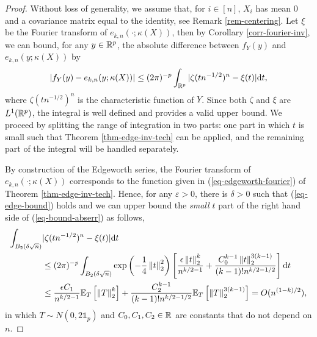 \begin{proof}
    Without loss of generality, we assume that, for $i \in [n]$, $X_i$ has mean 0 and a covariance matrix equal to the identity, see Remark \ref{rem-centering}. Let $\xi$ be the Fourier transform of $e_{k, n}(\cdot; \kappa(X))$, then by Corollary \ref{corr-fourier-inv}, we can bound, for any $y \in \Rp$, the absolute difference between $f_Y(y)$ and $e_{k, n}(y; \kappa(X))$ by
    \begin{equation} \label{eq-bound-abserr}
        |f_Y(y) - e_{k, n}(y; \kappa(X))| \leq (2\pi)^{-p}\intRp{t}{|\zeta(tn^{-1/2})^n - \xi(t)|},
    \end{equation}
    where $\zeta(tn^{-1/2})^n$ is the characteristic function of $Y$. Since both $\zeta$ and $\xi$ are $L^1(\Rp)$, the integral is well defined and provides a valid upper bound. We proceed by splitting the range of integration in two parts: one part in which $t$ is small such that Theorem \ref{thm-edge-inv-tech} can be applied, and the remaining part of the integral will be handled separately.

    By construction of the Edgeworth series, the Fourier transform of $e_{k, n}(\cdot; \kappa(X))$ corresponds to the function given in (\ref{eq-edgeworth-fourier}) of Theorem \ref{thm-edge-inv-tech}. Hence, for any $\varepsilon > 0$, there is $\delta > 0$ such that (\ref{eq-edge-bound}) holds and we can upper bound the \textit{small $t$} part of the right hand side of (\ref{eq-bound-abserr}) as follows,
    \begin{align*}
        \int_{B_2(\delta\sqrt{n})} &|\zeta(tn^{-1/2})^n - \xi(t)| \d t\\
        &\leq (2\pi)^{-p}\int_{B_2(\delta\sqrt{n})}\expf{-\frac{1}{4}\norm{t}_2^2}\left[ \frac{\epsilon\norm{t}_2^k}{n^{k/2-1}} + \frac{C_0^{k-1}\norm{t}_2^{3(k-1)}}{(k-1)!n^{k/2-1/2}} \right] \d t \\
        &\leq \frac{\epsilon C_1}{n^{k/2-1}}\expec{T}{\norm{T}^k_2} + \frac{C_2^{k-1}}{(k-1)!n^{k/2-1/2}}\expec{T}{\norm{T}_2^{3(k-1)}}
        = O(n^{(1-k)/2}),
    \end{align*}
    in which $T \sim N(0, 2\mathbb{1}_p)$ and $C_0, C_1, C_2 \in \R$ are constants that do not depend on $n$. 


\end{proof}
